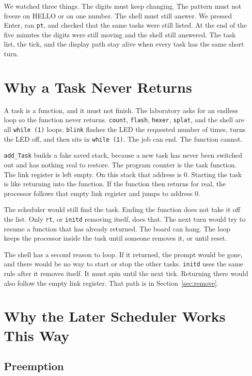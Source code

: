 \documentclass[conference,a4paper]{IEEEtran}
\begin{document}
We watched three things. The digits must keep changing. The pattern must not freeze on HELLO or on one number. The shell must still answer. We pressed Enter, ran \texttt{pt}, and checked that the same tasks were still listed. At the end of the five minutes the digits were still moving and the shell still answered. The task list, the tick, and the display path stay alive when every task has the same short turn.

\section{Why a Task Never Returns}

A task is a function, and it must not finish. The laboratory asks for an endless loop so the function never returns. \texttt{count}, \texttt{flash}, \texttt{hexer}, \texttt{splat}, and the shell are all \texttt{while (1)} loops. \texttt{blink} flashes the LED the requested number of times, turns the LED off, and then sits in \texttt{while (1)}. The job can end. The function cannot.

\texttt{add\_Task} builds a fake saved stack, because a new task has never been switched out and has nothing real to restore. The program counter is the task function. The link register is left empty. On this stack that address is 0. Starting the task is like returning into the function. If the function then returns for real, the processor follows that empty link register and jumps to address 0.

The scheduler would still find the task. Ending the function does not take it off the list. Only \texttt{rt}, or \texttt{initd} removing itself, does that. The next turn would try to resume a function that has already returned. The board can hang. The loop keeps the processor inside the task until someone removes it, or until reset.

The shell has a second reason to loop. If it returned, the prompt would be gone, and there would be no way to start or stop the other tasks. \texttt{initd} uses the same rule after it removes itself. It must spin until the next tick. Returning there would also follow the empty link register. That path is in Section~\ref{sec:remove}.

\section{Why the Later Scheduler Works This Way}

\subsection{Preemption}
\end{document}
